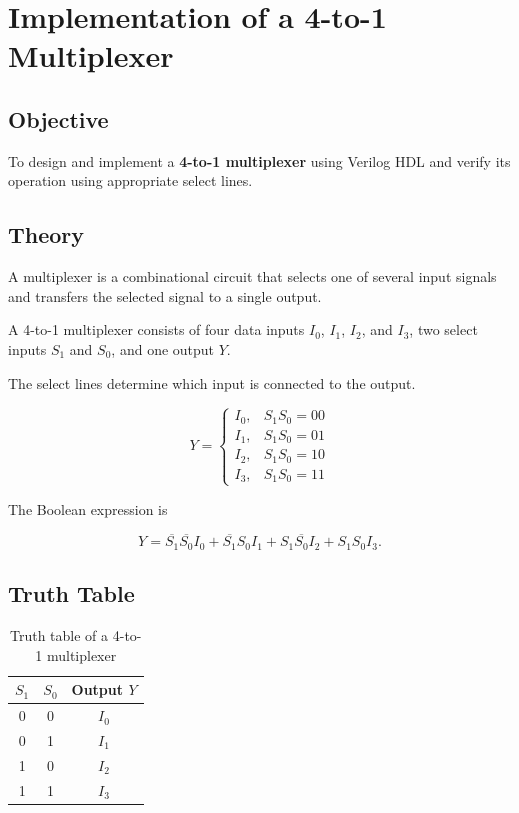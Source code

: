 \documentclass[12pt,a4paper]{report}
\begin{document}
\chapter{Implementation of a 4-to-1 Multiplexer}
\label{ch:pdf2}

\section{Objective}

To design and implement a \textbf{4-to-1 multiplexer} using Verilog HDL and verify its operation using appropriate select lines.

\section{Theory}

A multiplexer is a combinational circuit that selects one of several input signals and transfers the selected signal to a single output.

A 4-to-1 multiplexer consists of four data inputs $I_0$, $I_1$, $I_2$, and $I_3$, two select inputs $S_1$ and $S_0$, and one output $Y$.

The select lines determine which input is connected to the output.

\[
Y =
\begin{cases}
I_0, & S_1S_0=00\\
I_1, & S_1S_0=01\\
I_2, & S_1S_0=10\\
I_3, & S_1S_0=11
\end{cases}
\]

The Boolean expression is

\[
Y=\overline{S_1}\overline{S_0}I_0+
\overline{S_1}S_0I_1+
S_1\overline{S_0}I_2+
S_1S_0I_3.
\]

\section{Truth Table}

\begin{table}[H]
    \centering
    \begin{tabular}{|c|c|c|}
        \hline
        \textbf{$S_1$} & \textbf{$S_0$} & \textbf{Output $Y$} \\
        \hline
        0 & 0 & $I_0$ \\
        \hline
        0 & 1 & $I_1$ \\
        \hline
        1 & 0 & $I_2$ \\
        \hline
        1 & 1 & $I_3$ \\
        \hline
    \end{tabular}
    \caption{Truth table of a 4-to-1 multiplexer}
    \label{tab:4to1_mux}
\end{table}
\end{document}
